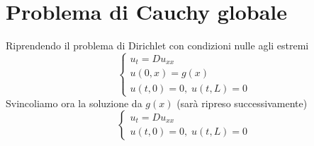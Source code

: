 \section{Problema di Cauchy globale}
Riprendendo il problema di Dirichlet con condizioni nulle agli estremi
\[
	\left\{
	\begin{array}{l}
		u_t=Du_{xx} \\
		u(0,x)=g(x) \\
		u(t,0)=0, \; u(t,L)=0
	\end{array}
	\right.
\]
Svincoliamo ora la soluzione da $g(x)$ (sar\`a ripreso successivamente)
\[
	\left\{
	\begin{array}{l}
		u_t=Du_{xx} \\
		u(t,0)=0, \; u(t,L)=0
	\end{array}
	\right.
\]
